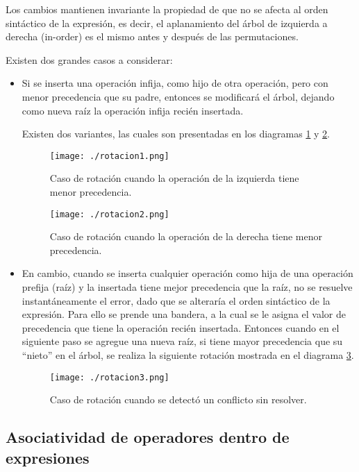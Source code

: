 Los cambios mantienen invariante la propiedad de que no se afecta al orden sintáctico de la expresión, es decir, el aplanamiento del árbol de izquierda a derecha (in-order) es el mismo antes y después de las permutaciones.

Existen dos grandes casos a considerar:

\begin{itemize}
\item Si se inserta una operación infija, como hijo de otra operación, pero con menor precedencia que su padre, entonces se modificará el árbol, dejando como nueva raíz la operación infija recién insertada. 

Existen dos variantes, las cuales son presentadas en los diagramas \ref{rotacion1} y \ref{rotacion2}.

\begin{figure}[h!]\centering
\texttt{[image: ./rotacion1.png]}
\caption{\label{rotacion1} Caso de rotación cuando la operación de la izquierda tiene menor precedencia.}
\end{figure}

\begin{figure}[h!]\centering
\texttt{[image: ./rotacion2.png]}
\caption{\label{rotacion2} Caso de rotación cuando la operación de la derecha tiene menor precedencia.}
\end{figure}

\item En cambio, cuando se inserta cualquier operación como hija de una operación prefija (raíz) y la insertada tiene mejor precedencia que la raíz, no se resuelve instantáneamente el error, dado que se alteraría el orden sintáctico de la expresión. Para ello se prende una bandera, a la cual se le asigna el valor de precedencia que tiene la operación recién insertada. Entonces cuando en el siguiente paso se agregue una nueva raíz, si tiene mayor precedencia que su ``nieto'' en el árbol, se realiza la siguiente rotación mostrada en el diagrama \ref{rotacion3}.

\begin{figure}[h!]\centering
\texttt{[image: ./rotacion3.png]}
\caption{\label{rotacion3} Caso de rotación cuando se detectó un conflicto sin resolver.}
\end{figure}
\end{itemize}

\subsection{Asociatividad de operadores dentro de expresiones}

